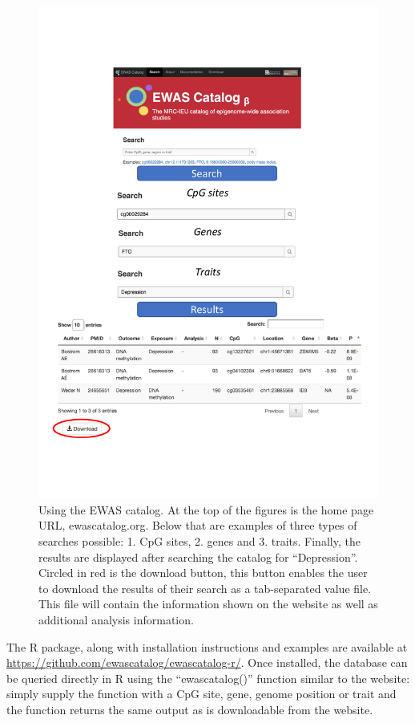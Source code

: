 \documentclass[11pt,oneside]{bristolthesis}
\begin{document}
\begin{figure}

{\centering \includegraphics[width=1\linewidth]{figure/03-ewas_catalog/using_the_catalog} 

}

\caption{Using the EWAS catalog. 
At the top of the figures is the home page URL, ewascatalog.org. 
Below that are examples of three types of searches possible: 
1. CpG sites, 2. genes and 3. traits. 
Finally, the results are displayed after searching the catalog for “Depression”. 
Circled in red is the download button, this button enables the user to download the results of their search as a tab-separated value file. 
This file will contain the information shown on the website as well as additional analysis information.}\label{fig:catalog-use}
\end{figure}
The R package, along with installation instructions and examples are available at \url{https://github.com/ewascatalog/ewascatalog-r/}. Once installed, the database can be queried directly in R using the ``ewascatalog()'' function similar to the website: simply supply the function with a CpG site, gene, genome position or trait and the function returns the same output as is downloadable from the website.
\end{document}
